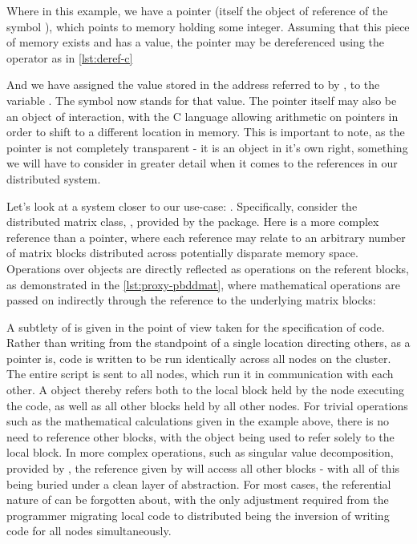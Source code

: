 
Where in this example, we have a pointer (itself the object of reference
of the symbol ), which points to memory holding some integer.
Assuming that this piece of memory exists and has a value, the pointer
may be dereferenced using the  operator as in \cref{lst:deref-c}


And we have assigned the value stored in the address referred to by
, to the variable . The symbol  now stands
for that value. The pointer itself may also be an object of interaction,
with the C language allowing arithmetic on pointers in order to shift to
a different location in memory. This is important to note, as the
pointer is not completely transparent - it is an object in it's own
right, something we will have to consider in greater detail when it
comes to the references in our distributed system.

Let's look at a system closer to our use-case: . Specifically,
consider the distributed matrix class, , provided by
the  package. Here is a more complex reference than a pointer,
where each  reference may relate to an arbitrary number
of matrix blocks distributed across potentially disparate memory space.
Operations over  objects are directly reflected as
operations on the referent blocks, as demonstrated in the \cref{lst:proxy-pbddmat},
where mathematical operations are passed on indirectly through
the  reference to the underlying matrix blocks:


A subtlety of  is given in the point of view taken for the
specification of code. Rather than writing from the standpoint of a
single location directing others, as a pointer is,  code is written
to be run identically across all nodes on the cluster. The entire script
is sent to all nodes, which run it in communication with each other. A
 object thereby refers both to the local block held by
the node executing the code, as well as all other blocks held by all
other nodes. For trivial operations such as the mathematical
calculations given in the example above, there is no need to reference
other blocks, with the  object being used to refer
solely to the local block. In more complex operations, such as singular
value decomposition, provided by , the reference given by
 will access all other blocks - with all of this being
buried under a clean layer of abstraction. For most cases, the
referential nature of  can be forgotten about, with the
only adjustment required from the programmer migrating local code to
distributed being the inversion of writing code for all nodes
simultaneously.

